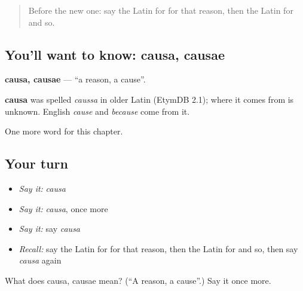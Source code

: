 \begin{quote}
Before the new one: say the Latin for for that reason, then the Latin for and so.
\end{quote}

\subsection*{You'll want to know: causa, causae}
\textbf{causa, causae} — \textquotedblleft{}a reason, a cause\textquotedblright{}.

\begin{cousinweb}
\textbf{causa} was spelled \emph{caussa} in older Latin (EtymDB 2.1); where it comes from is unknown. English \emph{cause} and \emph{because} come from it.
\end{cousinweb}

\begin{grammarlens}[title={What you've built}]
One more word for this chapter.
\end{grammarlens}

\subsection*{Your turn}
\begin{itemize}
\raggedright
  \item \emph{Say it:} \emph{causa}
  \item \emph{Say it:} \emph{causa}, once more
  \item \emph{Say it:} say \emph{causa}
  \item \emph{Recall:} say the Latin for for that reason, then the Latin for and so, then say \emph{causa} again
\end{itemize}

\begin{tcolorbox}[breakable,colback=teal!4,colframe=teal!35!black,title={Before you move on}]
What does causa, causae mean? (\textquotedblleft{}A reason, a cause\textquotedblright{}.) Say it once more.
\end{tcolorbox}
